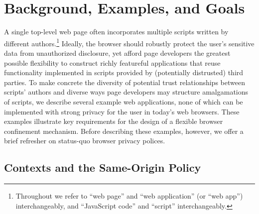 \section{Background, Examples, and Goals}

A single top-level web page often incorporates multiple scripts
written by different authors.\footnote{Throughout we refer to ``web
  page'' and ``web application'' (or ``web app'') interchangeably, and
  ``JavaScript code'' and ``script'' interchangeably.} Ideally, the
browser should  robustly protect the user's sensitive data from
unauthorized disclosure, yet afford page developers the greatest
possible flexibility to construct richly featureful applications that
reuse functionality implemented in scripts provided by (potentially
distrusted) third parties.  To make concrete the diversity of potential
trust relationships between scripts' authors and diverse ways page
developers may structure amalgamations of scripts, we describe several
example web applications, none of which can be implemented with strong
privacy for the user in today's web browsers. These examples
illustrate key requirements for the design of a flexible browser
confinement mechanism. Before describing these examples, however, we
offer a brief refresher on status-quo browser privacy polices.

\subsection{Contexts and the Same-Origin Policy}
\label{sec:goals}

